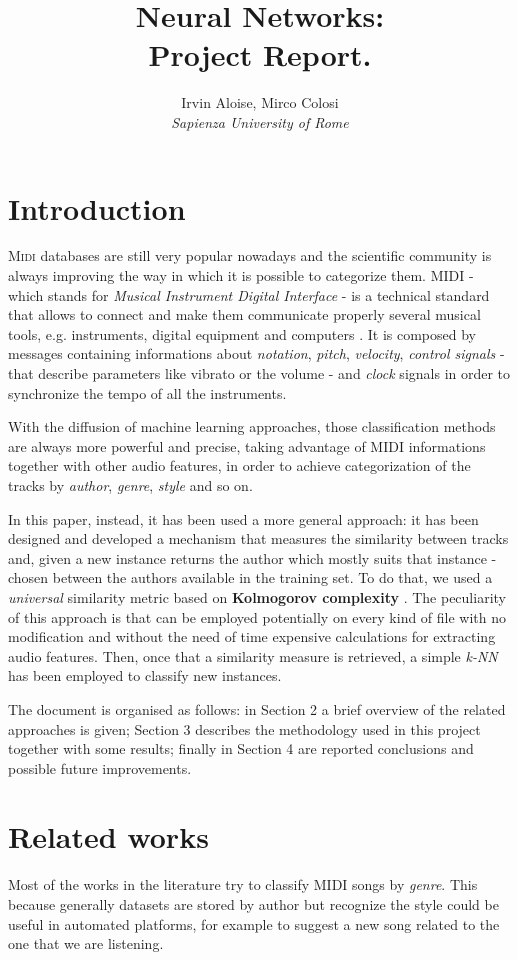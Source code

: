 \documentclass[a4paper]{article}
\title{ \huge Neural Networks: \\
	Project Report.}
\author{Irvin Aloise, Mirco Colosi\\
	\textit{Sapienza University of Rome}}
\begin{document}
	
	\maketitle
	
	\section{Introduction}
	\lettrine[nindent=0em,lines=2]{M}{idi} databases are still very popular nowadays and the scientific community is always improving the way in which it is possible to categorize them. MIDI - which stands for \textit{Musical Instrument Digital Interface} - is a technical standard that allows to connect and make them communicate properly several musical tools, e.g. instruments, digital equipment and computers \cite{midi}. It is composed by messages containing informations about \textit{notation}, \textit{pitch}, \textit{velocity}, \textit{control signals} - that describe parameters like vibrato or the volume - and \textit{clock} signals in order to synchronize the tempo of all the instruments.
	
	With the diffusion of machine learning approaches, those classification methods are always more powerful and precise, taking advantage of MIDI informations together with other audio features, in order to achieve categorization of the tracks by \textit{author}, \textit{genre}, \textit{style} and so on. 
	
	In this paper, instead, it has been used a more general approach: it has been designed and developed a mechanism that measures the similarity between tracks and, given a new instance returns the author which mostly suits that instance - chosen between the authors available in the training set. To do that, we used a \textit{universal} similarity metric based on \textbf{Kolmogorov complexity} \cite{kolmogorov}. The peculiarity of this approach is that can be employed potentially on every kind of file with no modification and without the need of time expensive calculations for extracting audio features. Then, once that a similarity measure is retrieved, a simple \textit{k-NN} has been employed to classify new instances.
	
	The document is organised as follows: in Section 2 a brief overview of the related approaches is given; Section 3 describes the methodology used in this project together with some results; finally in Section 4 are reported conclusions and possible future improvements.
	
	
	\section{Related works}
	\lettrine[nindent=0em,lines=2]{M}{}ost of the works in the literature try to classify MIDI songs by \textit{genre}. This because generally datasets are stored by author but recognize the style could be useful in automated platforms, for example to suggest a new song related to the one that we are listening. 
	
\end{document}
